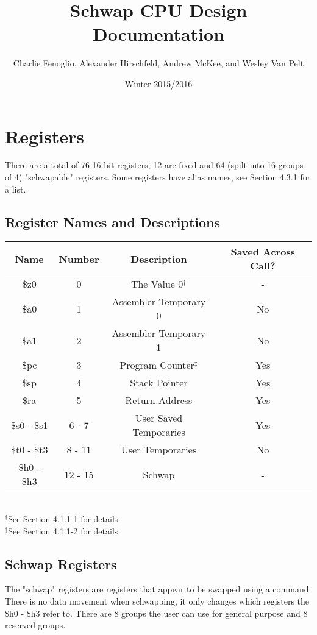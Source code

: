 \documentclass{article}
\title{Schwap CPU Design Documentation}
\author{Charlie Fenoglio, Alexander Hirschfeld, Andrew McKee, and Wesley Van Pelt}
\date{Winter 2015/2016}
\begin{document}
\maketitle
\section{Registers}
	There are a total of 76 16-bit registers; 12 are fixed and 64 (spilt into 16 groups of 4) "schwapable" registers.  Some registers have alias names, see Section 4.3.1 for a list.
	\subsection{Register Names and Descriptions}
		\begin{center}
			\begin{tabular}{| c | c | c | c |}
				\hline
				    Name        & Number  & Description            & Saved Across Call? \\ \hline
				    \$z0        & 0       & The Value 0$^\dagger$  & -   \\ \hline
				    \$a0        & 1       & Assembler Temporary 0  & No  \\ \hline
				    \$a1        & 2       & Assembler Temporary 1  & No  \\ \hline
				    \$pc        & 3       & Program Counter$^\ddagger$& Yes \\ \hline
				    \$sp        & 4       & Stack Pointer          & Yes \\ \hline
				    \$ra        & 5       & Return Address         & Yes \\ \hline
				    \$s0 - \$s1 & 6 - 7   & User Saved Temporaries & Yes \\ \hline
				    \$t0 - \$t3 & 8 - 11  & User Temporaries       & No  \\ \hline
				    \$h0 - \$h3 & 12 - 15 & Schwap                 & -   \\
				\hline
			\end{tabular} \\
			$^\dagger$See Section 4.1.1-1 for details\\
			$^\ddagger$See Section 4.1.1-2 for details
		\end{center}
	\subsection{Schwap Registers}
		The "schwap" registers are registers that appear to be swapped using a command.  There is no data movement when schwapping, it only changes which registers the \$h0 - \$h3 refer to.  There are 8 groups the user can use for general purpose and 8 reserved groups.
\end{document}
